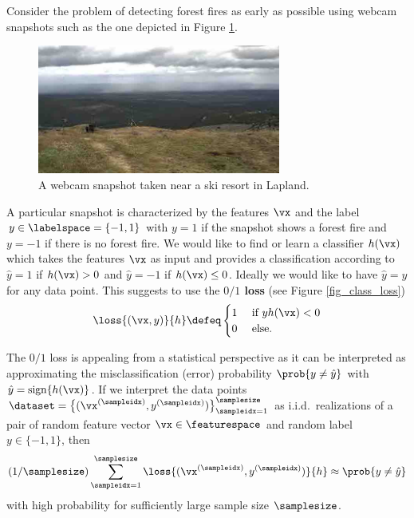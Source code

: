 \documentclass[12pt]{report}
\begin{document}
Consider the problem of detecting forest fires as early as possible 
using webcam snapshots such as the one depicted in Figure \ref{fig:webcam_forestfire}. 
\begin{figure}[htbp]
\begin{center}
\includegraphics[width=8cm]{WebcamLapland.jpg}  
\caption{A webcam snapshot taken near a ski resort in Lapland.}
\label{fig:webcam_forestfire}
\end{center}
\end{figure}
A particular snapshot is characterized by the features $\vx$ and 
the label $y \in \labelspace=\{-1,1\}$ with $y=1$ if the snapshot 
shows a forest fire and $y=-1$ if there is no forest fire. We would 
like to find or learn a classifier $h(\vx)$ which takes the features $\vx$ 
as input and provides a classification according to $\hat{y} = 1$ 
if $h(\vx) >0$ and $\hat{y}=-1$ if $h(\vx) \leq 0$. Ideally we 
would like to have $\hat{y} = y$ for any data point. This suggests 
to use the {\bf $0/1$ loss} (see Figure \ref{fig_class_loss})
\begin{equation}
\label{equ_def_0_1}
\loss{(\vx,y)}{h} \defeq \begin{cases} 1 &\mbox{ if } y h(\vx) < 0 \\ 0 & \mbox{ else.} \end{cases}
\end{equation} 
 
The $0/1$ loss is appealing from a statistical perspective as 
it can be interpreted as approximating the misclassification (error) probability 
$\prob{ y \neq \hat{y} }$ with $\hat{y} = {\rm sign } \{ h(\vx) \}$. 
If we interpret the data points $\dataset = \big\{ (\vx^{(\sampleidx)},y^{(\sampleidx)}) \big\}_{\sampleidx=1}^{\samplesize}$ 
as i.i.d.\ realizations of a pair of random feature vector 
$\vx \in \featurespace$ and random label $y \in \{-1,1\}$, then 
\begin{equation} 
\label{equ_0_1_approx_prob}
(1/\samplesize) \sum_{\sampleidx=1}^{\samplesize} \loss{(\vx^{(\sampleidx)},y^{(\sampleidx)})}{h} \approx \prob{ y \neq \hat{y} }
\end{equation} 
with high probability for sufficiently large sample size $\samplesize$. 
\end{document}
